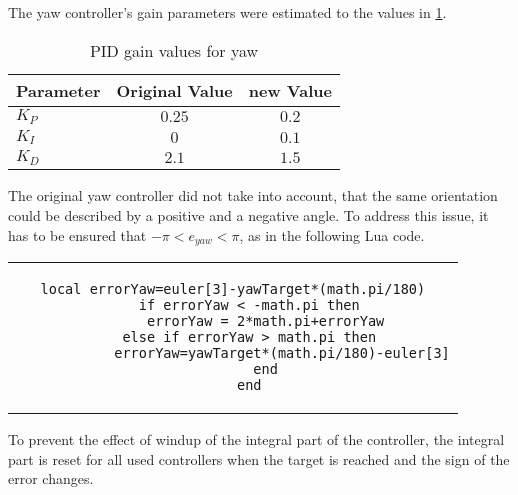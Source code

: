 The yaw controller's gain parameters were estimated to the values in \ref{tab:PIDyaw}.
\begin{table}[h]
	\centering
	\begin{tabular}{|l|c|c|}
    		\hline
		Parameter & Original Value & new Value \\
		\hline
    		$K_P$ & $0.25$ &  $0.2$\\
    		\hline
		$K_I$ & $0$ & $0.1$   \\
    		\hline
		$K_D$  & $2.1$ & $1.5$  \\
    		\hline
	\end{tabular}
    	\caption{\gls{PID} gain values for yaw}
      	\label{tab:PIDyaw}
\end{table}
The original yaw controller did not take into account, that the same orientation could be described by a positive and a negative angle.
To address this issue, it has to be ensured that $-\pi<e_{yaw}<\pi$, as in the following Lua code.
\begin{center}
\begin{tabular}{c}
\begin{lstlisting}[basicstyle=\small, language={[5.2]Lua}, caption={Lua yaw error handling}]
	local errorYaw=euler[3]-yawTarget*(math.pi/180)
	if errorYaw < -math.pi then
		errorYaw = 2*math.pi+errorYaw
	else if errorYaw > math.pi then
			errorYaw=yawTarget*(math.pi/180)-euler[3]
		end
	end
\end{lstlisting}

\end{tabular}
\end{center}


To prevent the effect of windup of the integral part of the controller, the integral part is reset for all used controllers when the target is reached and the sign of the error changes.






